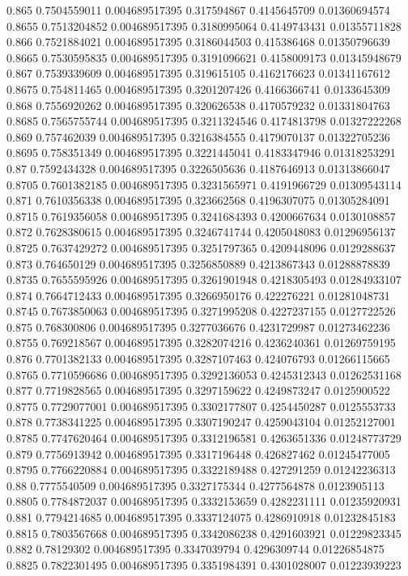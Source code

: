 {0.865 0.7504559011 0.004689517395 0.317594867 0.4145645709 0.01360694574
0.8655 0.7513204852 0.004689517395 0.3180995064 0.4149743431 0.01355711828
0.866 0.7521884021 0.004689517395 0.3186044503 0.415386468 0.01350796639
0.8665 0.7530595835 0.004689517395 0.3191096621 0.4158009173 0.01345948679
0.867 0.7539339609 0.004689517395 0.319615105 0.4162176623 0.01341167612
0.8675 0.754811465 0.004689517395 0.3201207426 0.4166366741 0.0133645309
0.868 0.7556920262 0.004689517395 0.320626538 0.4170579232 0.01331804763
0.8685 0.7565755744 0.004689517395 0.3211324546 0.4174813798 0.01327222268
0.869 0.757462039 0.004689517395 0.3216384555 0.4179070137 0.01322705236
0.8695 0.758351349 0.004689517395 0.3221445041 0.4183347946 0.01318253291
0.87 0.7592434328 0.004689517395 0.3226505636 0.4187646913 0.01313866047
0.8705 0.7601382185 0.004689517395 0.3231565971 0.4191966729 0.01309543114
0.871 0.7610356338 0.004689517395 0.323662568 0.4196307075 0.01305284091
0.8715 0.7619356058 0.004689517395 0.3241684393 0.4200667634 0.0130108857
0.872 0.7628380615 0.004689517395 0.3246741744 0.4205048083 0.01296956137
0.8725 0.7637429272 0.004689517395 0.3251797365 0.4209448096 0.0129288637
0.873 0.764650129 0.004689517395 0.3256850889 0.4213867343 0.01288878839
0.8735 0.7655595926 0.004689517395 0.3261901948 0.4218305493 0.01284933107
0.874 0.7664712433 0.004689517395 0.3266950176 0.422276221 0.01281048731
0.8745 0.7673850063 0.004689517395 0.3271995208 0.4227237155 0.0127722526
0.875 0.768300806 0.004689517395 0.3277036676 0.4231729987 0.01273462236
0.8755 0.769218567 0.004689517395 0.3282074216 0.4236240361 0.01269759195
0.876 0.7701382133 0.004689517395 0.3287107463 0.424076793 0.01266115665
0.8765 0.7710596686 0.004689517395 0.3292136053 0.4245312343 0.01262531168
0.877 0.7719828565 0.004689517395 0.3297159622 0.4249873247 0.0125900522
0.8775 0.7729077001 0.004689517395 0.3302177807 0.4254450287 0.0125553733
0.878 0.7738341225 0.004689517395 0.3307190247 0.4259043104 0.01252127001
0.8785 0.7747620464 0.004689517395 0.3312196581 0.4263651336 0.01248773729
0.879 0.7756913942 0.004689517395 0.3317196448 0.426827462 0.01245477005
0.8795 0.7766220884 0.004689517395 0.3322189488 0.427291259 0.01242236313
0.88 0.7775540509 0.004689517395 0.3327175344 0.4277564878 0.0123905113
0.8805 0.7784872037 0.004689517395 0.3332153659 0.4282231111 0.01235920931
0.881 0.7794214685 0.004689517395 0.3337124075 0.4286910918 0.01232845183
0.8815 0.7803567668 0.004689517395 0.3342086238 0.4291603921 0.01229823345
0.882 0.78129302 0.004689517395 0.3347039794 0.4296309744 0.01226854875
0.8825 0.7822301495 0.004689517395 0.3351984391 0.4301028007 0.01223939223
}
